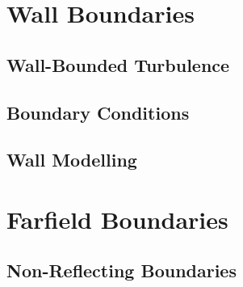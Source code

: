 \section{Wall Boundaries}
\subsection{Wall-Bounded Turbulence}
\subsection{Boundary Conditions}
\subsection{Wall Modelling}
\section{Farfield Boundaries}
\subsection{Non-Reflecting Boundaries}